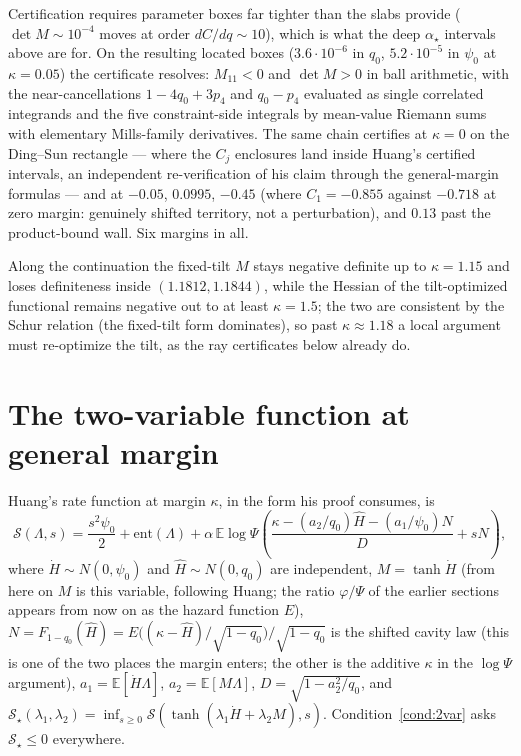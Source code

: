 \documentclass[11pt]{article}
\theoremstyle{remark}
\newcommand{\E}{\mathbb{E}}
\newcommand{\sS}{\mathcal{S}}
\begin{document}
Certification requires parameter boxes far tighter than the slabs
provide ($\det M\sim10^{-4}$ moves at order $dC/dq\sim10$), which is
what the deep $\alpha_\star$ intervals above are for.  On the
resulting located boxes ($3.6\cdot10^{-6}$ in $q_0$,
$5.2\cdot10^{-5}$ in $\psi_0$ at $\kappa=0.05$) the certificate
resolves: $M_{11}<0$ and $\det M>0$ in ball arithmetic, with the
near-cancellations $1-4q_0+3p_4$ and $q_0-p_4$ evaluated as single
correlated integrands and the five constraint-side integrals by
mean-value Riemann sums with elementary Mills-family derivatives.
The same chain certifies at $\kappa=0$ on the Ding--Sun rectangle
--- where the $C_j$ enclosures land inside Huang's certified
intervals, an independent re-verification of his claim through the
general-margin formulas --- and at $-0.05$, $0.0995$, $-0.45$ (where
$C_1=-0.855$ against $-0.718$ at zero margin: genuinely shifted
territory, not a perturbation), and $0.13$ past the product-bound
wall.  Six margins in all.

Along the continuation the fixed-tilt $M$ stays negative definite up
to $\kappa=1.15$ and loses definiteness inside $(1.1812,1.1844)$,
while the Hessian of the tilt-optimized functional remains negative
out to at least $\kappa=1.5$; the two are consistent by the Schur
relation (the fixed-tilt form dominates), so past
$\kappa\approx1.18$ a local argument must re-optimize the tilt, as
the ray certificates below already do.

\section{The two-variable function at general margin}\label{sec:twovar}

Huang's rate function at margin $\kappa$, in the form his proof
consumes, is
\[
\sS(\Lambda,s)=\frac{s^2\psi_0}{2}+\mathrm{ent}(\Lambda)
+\alpha\,\E\log\Psi\!\left(
\frac{\kappa-(a_2/q_0)\hat H-(a_1/\psi_0)N}{D}+sN\right),
\]
where $\dot H\sim N(0,\psi_0)$ and $\hat H\sim N(0,q_0)$ are
independent, $M=\tanh\dot H$ (from here on $M$ is this variable,
following Huang; the ratio $\varphi/\Psi$ of the earlier sections
appears from now on as the hazard function $E$),
$N=F_{1-q_0}(\hat H)=E\bigl((\kappa-\hat H)/\sqrt{1-q_0}\bigr)/
\sqrt{1-q_0}$ is the shifted cavity law (this is one of the two
places the margin enters; the other is the additive $\kappa$ in the
$\log\Psi$ argument), $a_1=\E[\dot H\Lambda]$, $a_2=\E[M\Lambda]$,
$D=\sqrt{1-a_2^2/q_0}$, and
$\sS_\star(\lambda_1,\lambda_2)=\inf_{s\ge0}
\sS(\tanh(\lambda_1\dot H+\lambda_2 M),s)$.
Condition~\ref{cond:2var} asks $\sS_\star\le0$ everywhere.
\end{document}
